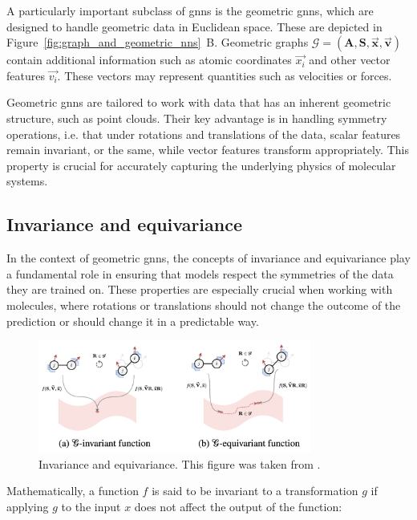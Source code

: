 A particularly important subclass of \acp{gnn} is the geometric \acp{gnn}, which are designed to handle geometric data in Euclidean space. These are depicted in Figure~\ref{fig:graph_and_geometric_nns}~B. Geometric graphs $\mathcal{G} = (\mathbf{A}, \mathbf{S}, \vec{\mathbf{x}}, \vec{\mathbf{v}})$ contain additional information such as atomic coordinates $\vec{x_i}$ and other vector features $\vec{v_i}$. These vectors may represent quantities such as velocities or forces.

Geometric \acp{gnn} are tailored to work with data that has an inherent geometric structure, such as point clouds. Their key advantage is in handling symmetry operations, i.e. that under rotations and translations of the data, scalar features remain invariant, or the same, while vector features transform appropriately. This property is crucial for accurately capturing the underlying physics of molecular systems.



\subsection{Invariance and equivariance}

In the context of geometric \acp{gnn}, the concepts of invariance and equivariance play a fundamental role in ensuring that models respect the symmetries of the data they are trained on. These properties are especially crucial when working with molecules, where rotations or translations should not change the outcome of the prediction or should change it in a predictable way.

\begin{figure}[t!]
    \centering
    \includegraphics[width=0.8\textwidth]{Figures/2_Theory/invariance_equivariance.png}
    \caption{Invariance and equivariance. This figure was taken from \citep{duvalHitchhikersGuideGeometric2024}.}
    \label{fig:invariance_equivariance}
\end{figure}

Mathematically, a function $f$ is said to be invariant to a transformation $g$ if applying $g$ to the input $x$ does not affect the output of the function:

